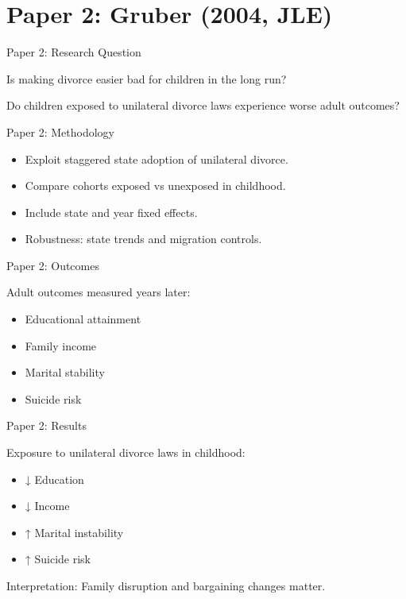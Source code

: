 \documentclass[aspectratio=169]{beamer}
\begin{document}
\section{Paper 2: Gruber (2004, JLE)}

\begin{frame}{Paper 2: Research Question}

Is making divorce easier bad for children in the long run?

Do children exposed to unilateral divorce laws
experience worse adult outcomes?

\end{frame}

\begin{frame}{Paper 2: Methodology}

\begin{itemize}
    \item Exploit staggered state adoption of unilateral divorce.
    \item Compare cohorts exposed vs unexposed in childhood.
    \item Include state and year fixed effects.
    \item Robustness: state trends and migration controls.
\end{itemize}

\end{frame}

\begin{frame}{Paper 2: Outcomes}

Adult outcomes measured years later:

\begin{itemize}
    \item Educational attainment
    \item Family income
    \item Marital stability
    \item Suicide risk
\end{itemize}

\end{frame}

\begin{frame}{Paper 2: Results}

Exposure to unilateral divorce laws in childhood:

\begin{itemize}
    \item ↓ Education
    \item ↓ Income
    \item ↑ Marital instability
    \item ↑ Suicide risk
\end{itemize}

Interpretation:
Family disruption and bargaining changes matter.

\end{frame}
\end{document}
